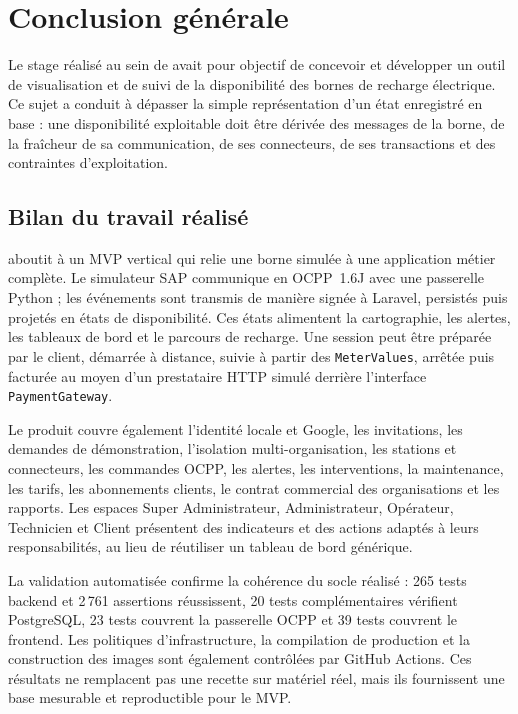 \chapter*{Conclusion générale}

Le stage réalisé au sein de \CompanyName{} avait pour objectif de concevoir et
développer un outil de visualisation et de suivi de la disponibilité des bornes
de recharge électrique. Ce sujet a conduit à dépasser la simple représentation
d'un état enregistré en base : une disponibilité exploitable doit être dérivée
des messages de la borne, de la fraîcheur de sa communication, de ses
connecteurs, de ses transactions et des contraintes d'exploitation.

\section*{Bilan du travail réalisé}

\ProjectName{} aboutit à un MVP vertical qui relie une borne simulée à une
application métier complète. Le simulateur SAP communique en OCPP~1.6J avec une
passerelle Python ; les événements sont transmis de manière signée à Laravel,
persistés puis projetés en états de disponibilité. Ces états alimentent la
cartographie, les alertes, les tableaux de bord et le parcours de recharge.
Une session peut être préparée par le client, démarrée à distance, suivie à
partir des \texttt{MeterValues}, arrêtée puis facturée au moyen d'un prestataire
HTTP simulé derrière l'interface \texttt{PaymentGateway}.

Le produit couvre également l'identité locale et Google, les invitations, les
demandes de démonstration, l'isolation multi-organisation, les stations et
connecteurs, les commandes OCPP, les alertes, les interventions, la maintenance,
les tarifs, les abonnements clients, le contrat commercial des organisations et
les rapports. Les espaces Super Administrateur, Administrateur, Opérateur,
Technicien et Client présentent des indicateurs et des actions adaptés à leurs
responsabilités, au lieu de réutiliser un tableau de bord générique.

La validation automatisée confirme la cohérence du socle réalisé : 265 tests
backend et 2\,761 assertions réussissent, 20 tests complémentaires vérifient
PostgreSQL, 23 tests couvrent la passerelle OCPP et 39 tests couvrent le frontend.
Les politiques d'infrastructure, la compilation de production et la construction
des images sont également contrôlées par GitHub Actions. Ces résultats ne
remplacent pas une recette sur matériel réel, mais ils fournissent une base
mesurable et reproductible pour le MVP.

